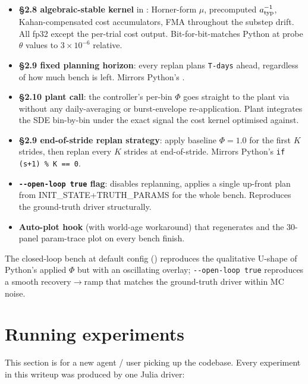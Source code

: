 \documentclass[11pt,a4paper]{article}
\begin{document}
\begin{itemize}[itemsep=2pt]
\item \textbf{\S 2.8 algebraic-stable kernel} in
  : Horner-form $\mu$,
  precomputed $a_{\rm typ}^{-1}$, Kahan-compensated cost accumulators,
  FMA throughout the substep drift. All fp32 except the per-trial
  cost output. Bit-for-bit-matches Python at probe $\theta$ values
  to $3\times 10^{-6}$ relative.
\item \textbf{\S 2.9 fixed planning horizon}: every replan plans
  \texttt{T-days} ahead, regardless of how much bench is left. Mirrors
  Python's .
\item \textbf{\S 2.10  plant call}: the
  controller's per-bin $\Phi$ goes straight to the plant via
   without any daily-averaging or
  burst-envelope re-application. Plant integrates the SDE bin-by-bin
  under the exact signal the cost kernel optimised against.
\item \textbf{\S 2.9 end-of-stride replan strategy}: apply baseline
  $\Phi=1.0$ for the first $K$ strides, then replan every $K$
  strides at end-of-stride. Mirrors Python's
  \texttt{if (s+1) \% K == 0}.
\item \textbf{\texttt{-{}-open-loop true} flag}: disables replanning,
  applies a single up-front plan from INIT\_STATE+TRUTH\_PARAMS for
  the whole bench. Reproduces the ground-truth driver structurally.
\item \textbf{Auto-plot hook} (with 
  world-age workaround) that regenerates
   and the 30-panel param-trace plot
  on every bench finish.
\end{itemize}

The closed-loop bench at default config () reproduces the qualitative U-shape of Python's
applied $\Phi$ but with an oscillating overlay; \texttt{-{}-open-loop
true} reproduces a smooth recovery$\to$ramp that matches the
ground-truth driver within MC noise.

\section{Running experiments}

This section is for a new agent / user picking up the codebase. Every
experiment in this writeup was produced by one Julia driver:

\begin{center}
\end{center}
\end{document}
